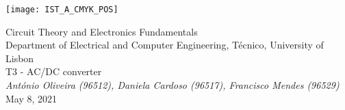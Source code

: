 
\thispagestyle {empty}

\texttt{[image: IST\_A\_CMYK\_POS]}

\begin{center}
%
\vspace{1.0cm}

\vspace{1cm}
{\FontLb Circuit Theory and Electronics Fundamentals} \\ %
\vspace{1cm}
{\FontSn Department of Electrical and Computer Engineering, Técnico, University of Lisbon} \\ %
\vspace{1cm}
{\FontSn T3 - AC/DC converter} \\
\vspace{1cm}
{\FontSn\it António Oliveira (96512), Daniela Cardoso (96517), Francisco Mendes (96529)} \\
\vspace{1cm}
{\FontSn May 8, 2021} \\ %
%
\end{center}

